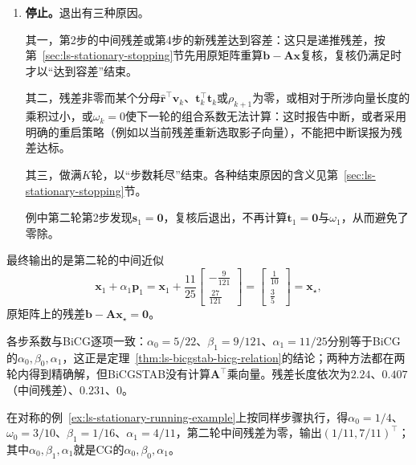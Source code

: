 \begin{enumerate}
 例中第二轮由第1步，
 \[
  \begin{gathered}
  \bm v_1=\begin{bmatrix}-\tfrac9{121}\\\tfrac{63}{121}\end{bmatrix},\\
  \widehat{\bm r}^\top\bm v_1=\frac{117}{121},\qquad
  \alpha_1=\frac{117/275}{117/121}=\frac{11}{25},
  \end{gathered}
 \]
 $\alpha_1$也与BiCG的$\alpha_1$相同，于是
 \[
  \bm s_1=\bm r_1-\frac{11}{25}\bm v_1=\bm 0 .
 \]

 \item \textbf{停止。}退出有三种原因。

 其一，第2步的中间残差或第4步的新残差达到容差：这只是递推残差，按第~\ref{sec:ls-stationary-stopping}节先用原矩阵重算$\bm b-\bm A\bm x$复核，复核仍满足时才以“达到容差”结束。

 其二，残差非零而某个分母$\widehat{\bm r}^\top\bm v_k$、$\bm t_k^\top\bm t_k$或$\rho_{k+1}$为零，或相对于所涉向量长度的乘积过小，或$\omega_k=0$使下一轮的组合系数无法计算：这时报告中断，或者采用明确的重启策略（例如以当前残差重新选取影子向量），不能把中断误报为残差达标。

 其三，做满$K$轮，以“步数耗尽”结束。各种结束原因的含义见第~\ref{sec:ls-stationary-stopping}节。

 例中第二轮第2步发现$\bm s_1=\bm 0$，复核后退出，不再计算$\bm t_1=\bm 0$与$\omega_1$，从而避免了零除。
\end{enumerate}

最终输出的是第二轮的中间近似
\[
 \bm x_1+\alpha_1\bm p_1=\bm x_1+\frac{11}{25}\begin{bmatrix}-\tfrac9{121}\\\tfrac{27}{121}\end{bmatrix}=\begin{bmatrix}\tfrac1{10}\\\tfrac35\end{bmatrix}=\bm x_\star ,
\]
原矩阵上的残差$\bm b-\bm A\bm x_\star=\bm 0$。

各步系数与BiCG逐项一致：$\alpha_0=5/22$、$\beta_1=9/121$、$\alpha_1=11/25$分别等于BiCG的$\alpha_0,\beta_0,\alpha_1$，这正是定理~\ref{thm:ls-bicgstab-bicg-relation}的结论；两种方法都在两轮内得到精确解，但BiCGSTAB没有计算$\bm A^\top$乘向量。残差长度依次为$2.24$、$0.407$（中间残差）、$0.231$、$0$。

在对称的例~\ref{ex:ls-stationary-running-example}上按同样步骤执行，得$\alpha_0=1/4$、$\omega_0=3/10$、$\beta_1=1/16$、$\alpha_1=4/11$，第二轮中间残差为零，输出$(1/11,7/11)^\top$；其中$\alpha_0,\beta_1,\alpha_1$就是CG的$\alpha_0,\beta_0,\alpha_1$。

